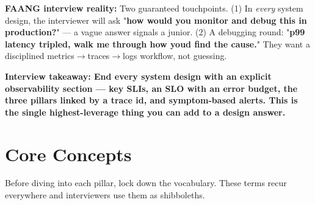 \documentclass[11pt]{article}
\begin{document}
\textbf{FAANG interview reality:} Two guaranteed touchpoints. (1) In \emph{every} system design, the interviewer will ask "\textbf{how would you monitor and debug this in production?}" --- a vague answer signals a junior. (2) A debugging round: "\textbf{p99 latency tripled, walk me through how you\textquotesingle d find the cause.}" They want a disciplined metrics\(\rightarrow\)traces\(\rightarrow\)logs workflow, not guessing.

\textbf{Interview takeaway: End every system design with an explicit observability section --- key SLIs, an SLO with an error budget, the three pillars linked by a trace id, and symptom-based alerts. This is the single highest-leverage thing you can add to a design answer.}

\section{Core Concepts}\label{core-concepts}

Before diving into each pillar, lock down the vocabulary. These terms recur everywhere and interviewers use them as shibboleths.
\end{document}
